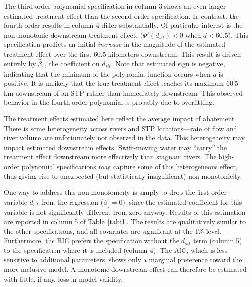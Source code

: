 \documentclass[12pt]{article}
\begin{document}
The third-order polynomial specification in column 3 shows an even larger estimated treatment effect than the second-order specification. In contrast, the fourth-order results in column 4 differ substantially. Of particular interest is the non-monotonic downstream treatment effect. ($\Phi'(d_{sit})<0$ when $d < 60.5$). This specification predicts an initial \textit{increase} in the magnitude of the estimated treatment effect over the first 60.5 kilometers downstream. This result is driven entirely by $\widehat{\beta}_1$, the coefficient on $d_{sit}$. Note that estimated sign is negative, indicating that the minimum of the polynomial function occurs when $d$ is positive. It is unlikely that the true treatment effect reaches its maximum 60.5 km downstream of an STP rather than immediately downstream. This observed behavior in the fourth-order polynomial is probably due to overfitting. 

The treatment effects estimated here reflect the average impact of abatement. There is some heterogeneity across rivers and STP locations---rate of flow and river volume are unfortunately not observed in the data. This heterogeneity may impact estimated downstream effects. Swift-moving water may ``carry'' the treatment effect downstream more effectively than stagnant rivers. The high-order polynomial specifications may capture some of this heterogeneous effect, thus giving rise to unexpected (but statistically insignificant) non-monotonicity.

One way to address this non-monotonicity is simply to drop the first-order variable $d_{sit}$ from the regression ($\beta_1 = 0)$, since the estimated coefficient for this variable is not significantly different from zero anyway. Results of this estimation are reported in column 5 of \mbox{Table \ref{tab:1}}. The results are qualitatively similar to the other specifications, and all covariates are significant at the 1\% level. Furthermore, the BIC prefers the specification without the $d_{sit}$ term (column 5) to the specification where it is included (column 4). The AIC, which is less sensitive to additional parameters, shows only a marginal preference toward the more inclusive model. A monotonic downstream effect can therefore be estimated with little, if any, loss in model validity. 
\end{document}
